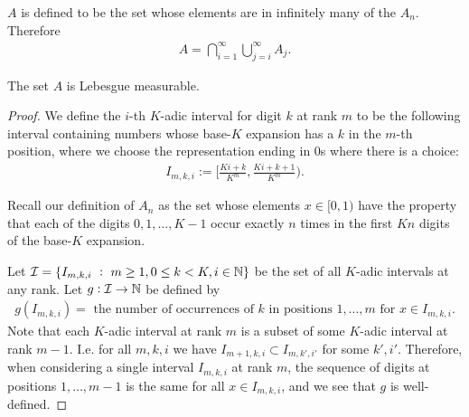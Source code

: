 $A$ is defined to be the set whose elements are in infinitely many of the $A_n$. Therefore
\begin{align*}
  A = \bigcap_{i=1}^\infty \bigcup_{j=i}^\infty A_j.
\end{align*}

\begin{claim*}
  The set $A$ is Lebesgue measurable.
\end{claim*}

\begin{proof}
  We define the $i$-th $K$-adic interval for digit $k$ at rank $m$ to be the following interval containing
  numbers whose base-$K$ expansion has a $k$ in the $m$-th position, where we choose the representation ending
  in $0$s where there is a choice:
  \begin{align*}
    I_{m, k, i} := \Bigg[\frac{Ki + k}{K^m}, \frac{Ki + k + 1}{K^m}\Bigg).
  \end{align*}

  Recall our definition of $A_n$ as the set whose elements $x \in [0, 1)$ have the property that each of the
  digits $0, 1, \ldots, K-1$ occur exactly $n$ times in the first $Kn$ digits of the base-$K$ expansion.

  Let $\mathcal I = \{I_{m, k, i} ~:~ m \geq 1, 0 \leq k < K, i \in \mathbb{N}\}$ be the set of all $K$-adic intervals at
  any rank. Let $g:\mathcal I \to \mathbb{N}$ be defined by
  \begin{align*}
    g(I_{m, k, i}) = \text{~the number of occurrences of $k$ in positions $1, \ldots, m$ for $x \in I_{m, k, i}$}.
  \end{align*}
  Note that each $K$-adic interval at rank $m$ is a subset of some $K$-adic interval at rank $m-1$. I.e. for
  all $m, k, i$ we have $I_{m+1, k, i} \subset I_{m, k', i'}$ for some $k', i'$. Therefore, when considering a
  single interval $I_{m, k, i}$ at rank $m$, the sequence of digits at positions $1, \dots, m-1$ is the same
  for all $x \in I_{m, k, i}$, and we see that $g$ is well-defined.


\end{proof}
